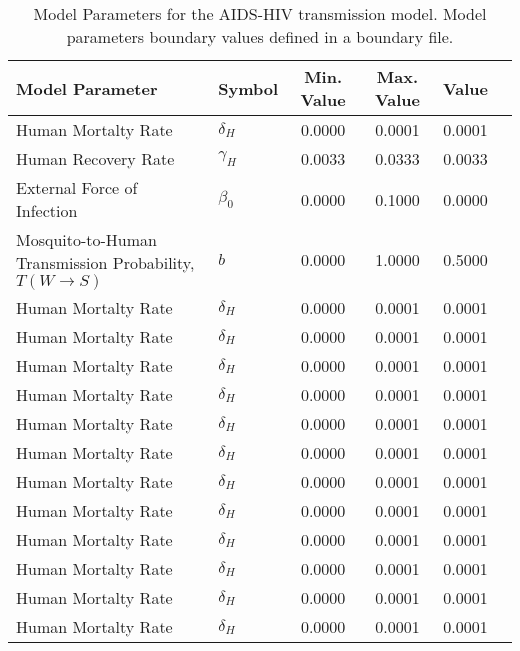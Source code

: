 \begin{table}
\centering
\begin{tabular}{p{5cm}lcccc}
{\bf Model Parameter} & {\bf Symbol} & {\bf Min. Value} & {\bf Max. Value} & {\bf Value}\\
\hline\hline
Human Mortalty Rate & $\delta_H$ & 0.0000 & 0.0001 & 0.0001\\
Human Recovery Rate & $\gamma_H$ & 0.0033 & 0.0333 & 0.0033\\
External Force of Infection & $\beta_0$ & 0.0000 & 0.1000 & 0.0000\\
Mosquito-to-Human Transmission Probability, $T(W\rightarrow S)$ & $b$ & 0.0000 & 1.0000 & 0.5000\\
Human Mortalty Rate & $\delta_H$ & 0.0000 & 0.0001 & 0.0001\\
Human Mortalty Rate & $\delta_H$ & 0.0000 & 0.0001 & 0.0001\\
Human Mortalty Rate & $\delta_H$ & 0.0000 & 0.0001 & 0.0001\\
Human Mortalty Rate & $\delta_H$ & 0.0000 & 0.0001 & 0.0001\\
Human Mortalty Rate & $\delta_H$ & 0.0000 & 0.0001 & 0.0001\\
Human Mortalty Rate & $\delta_H$ & 0.0000 & 0.0001 & 0.0001\\
Human Mortalty Rate & $\delta_H$ & 0.0000 & 0.0001 & 0.0001\\
Human Mortalty Rate & $\delta_H$ & 0.0000 & 0.0001 & 0.0001\\
Human Mortalty Rate & $\delta_H$ & 0.0000 & 0.0001 & 0.0001\\
Human Mortalty Rate & $\delta_H$ & 0.0000 & 0.0001 & 0.0001\\
Human Mortalty Rate & $\delta_H$ & 0.0000 & 0.0001 & 0.0001\\
Human Mortalty Rate & $\delta_H$ & 0.0000 & 0.0001 & 0.0001\\
\hline\hline
\end{tabular}
\caption{Model Parameters for the AIDS-HIV transmission model. Model parameters boundary values defined in a boundary file.}
\end{table}
